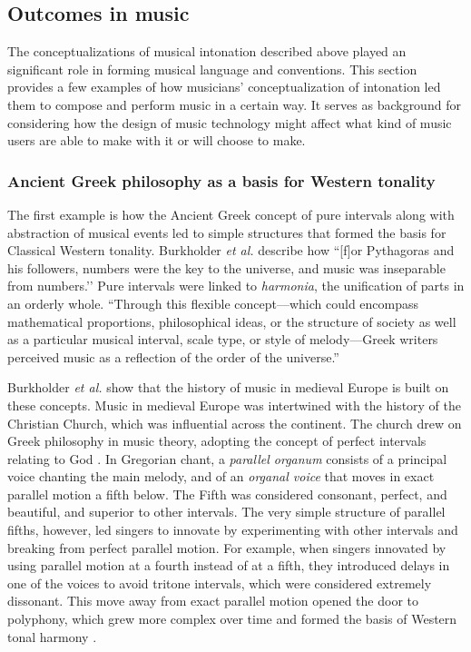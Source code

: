 \subsection{Outcomes in music}
The conceptualizations of musical intonation described above played an significant role in forming musical language and conventions. This section provides a few examples of how musicians' conceptualization of intonation led them to compose and perform music in a certain way. It serves as background for considering how the design of music technology might affect what kind of music users are able to make with it or will choose to make. 

\subsubsection{Ancient Greek philosophy as a basis for Western tonality}
The first example is how the Ancient Greek concept of pure intervals along with abstraction of musical events led to simple structures that formed the basis for Classical Western tonality. Burkholder \textit{et al.} describe how ``[f]or Pythagoras and his followers, numbers were the key to the universe, and music was inseparable from numbers.’’ Pure intervals were linked to \textit{harmonia}, the unification of parts in an orderly whole. ``Through this flexible concept---which could encompass mathematical proportions, philosophical ideas, or the structure of society as well as a particular musical interval, scale type, or style of melody---Greek writers perceived music as a reflection of the order of the universe.'' \cite[Ch.~1, p.~13]{burkholder2010history} 

Burkholder \textit{et al.} show that the history of music in medieval Europe is built on these concepts. Music in medieval Europe was intertwined with the history of the Christian Church, which was influential across the continent. The church drew on Greek philosophy in music theory, adopting the concept of perfect intervals relating to God \cite[Ch.~2, p.~22]{burkholder2010history}. In Gregorian chant, a \textit{parallel organum} consists of a principal voice chanting the main melody, and of an \textit{organal voice} that moves in exact parallel motion a fifth below. The Fifth was considered consonant, perfect, and beautiful, and superior to other intervals. The very simple structure of parallel fifths, however, led singers to innovate by experimenting with other intervals and breaking from perfect parallel motion. For example, when singers innovated by using parallel motion at a fourth instead of at a fifth, they introduced delays in one of the voices to avoid tritone intervals, which were considered extremely dissonant. This move away from exact parallel motion opened the door to polyphony, which grew more complex over time and formed the basis of Western tonal harmony \cite[Ch.~5, p.~86]{burkholder2010history}.

